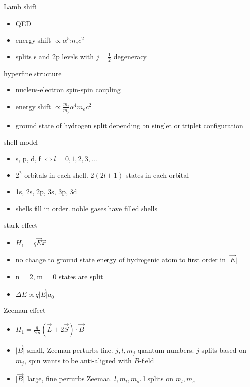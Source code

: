 \documentclass[avery5388, frame, grid]{flashcards}
\begin{document}
\begin{flashcard}{Lamb shift}
  {
    \begin{itemize}
    \item QED
    \item energy shift $\propto \alpha^{5} m_{e} c^{2}$
    \item splits s and 2p levels with $j = \frac{1}{2}$ degeneracy
    \end{itemize}
  }
\end{flashcard}

\begin{flashcard}{hyperfine structure}
  {
    \begin{itemize}
    \item nucleus-electron spin-spin coupling
    \item energy shift $\propto \frac{m_{e}}{m_{p}} \alpha^{4} m_{e} c^{2}$
      \item ground state of hydrogen split depending on singlet or triplet configuration
    \end{itemize}
  }
\end{flashcard}

\begin{flashcard}{shell model}
  {
    \begin{itemize}
    \item s, p, d, f $\iff l = 0, 1, 2, 3, \dots$
    \item $2^{2}$ orbitals in each shell. $2(2l + 1)$ states in each orbital
    \item 1s, 2s, 2p, 3s, 3p, 3d
    \item shells fill in order. noble gases have filled shells
    \end{itemize}
  }
\end{flashcard}

\begin{flashcard}{stark effect}
  {
    \begin{itemize}
    \item $H_{1} = q \vec{E} \vec{x}$
    \item no change to ground state energy of hydrogenic atom to first order in $\lvert \vec{E} \rvert$
    \item n = 2, m = 0 states are split
    \item $\Delta E \propto q \lvert \vec{E} \rvert a_{0}$
    \end{itemize}
  }
\end{flashcard}

\begin{flashcard}{Zeeman effect}
  {
    \begin{itemize}
    \item $H_{1} = \frac{q}{2m} (\vec{L} + 2\vec{S}) \cdot \vec{B}$
    \item $\lvert \vec{B} \rvert$ small, Zeeman perturbs fine. $j, l, m_{j}$ quantum numbers. $j$ splits based on $m_{j}$, spin wants to be anti-aligned with $B$-field
      \item $\lvert \vec{B} \rvert$ large, fine perturbs Zeeman. $l, m_{l}, m_{s}$. l splits on $m_{l}, m_{s}$
    \end{itemize}
  }
\end{flashcard}
\end{document}
